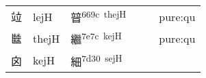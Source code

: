 \documentclass[14pt,a4paper]{scrartcl}
\begin{document}
\begin{longtable}[c]{@{}llllll@{}}
\begin{minipage}[t]{0.14\columnwidth}\raggedright\strut
竝
\strut\end{minipage} &
\begin{minipage}[t]{0.14\columnwidth}\raggedright\strut
lejH
\strut\end{minipage} &
\begin{minipage}[t]{0.14\columnwidth}\raggedright\strut
暜\textsuperscript{669c~thejH}
\strut\end{minipage} &
\begin{minipage}[t]{0.14\columnwidth}\raggedright\strut
\strut\end{minipage} &
\begin{minipage}[t]{0.14\columnwidth}\raggedright\strut
\strut\end{minipage} &
\begin{minipage}[t]{0.14\columnwidth}\raggedright\strut
pure:qu
\strut\end{minipage}\tabularnewline
\begin{minipage}[t]{0.14\columnwidth}\raggedright\strut
㡭
\strut\end{minipage} &
\begin{minipage}[t]{0.14\columnwidth}\raggedright\strut
thejH
\strut\end{minipage} &
\begin{minipage}[t]{0.14\columnwidth}\raggedright\strut
繼\textsuperscript{7e7c~kejH}
\strut\end{minipage} &
\begin{minipage}[t]{0.14\columnwidth}\raggedright\strut
\strut\end{minipage} &
\begin{minipage}[t]{0.14\columnwidth}\raggedright\strut
\strut\end{minipage} &
\begin{minipage}[t]{0.14\columnwidth}\raggedright\strut
pure:qu
\strut\end{minipage}\tabularnewline
\begin{minipage}[t]{0.14\columnwidth}\raggedright\strut
囟
\strut\end{minipage} &
\begin{minipage}[t]{0.14\columnwidth}\raggedright\strut
kejH
\strut\end{minipage} &
\begin{minipage}[t]{0.14\columnwidth}\raggedright\strut
細\textsuperscript{7d30~sejH}
\strut\end{minipage} &
\begin{minipage}[t]{0.14\columnwidth}\raggedright\strut

\end{minipage}
\end{longtable}
\end{document}
